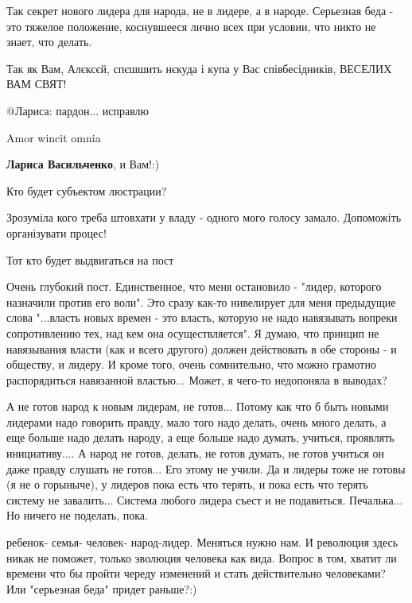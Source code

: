 \begin{itemize}
Так секрет нового лидера для народа, не в лидере, а в народе.
Серьезная беда - это тяжелое положение, коснувшееся лично всех при условии, что никто не знает, что делать.

Так як Вам, Алєксєй, спєшшить нєкуда і купа у Вас співбесідників, ВЕСЕЛИХ ВАМ СВЯТ!

@Лариса: пардон... исправлю

Amor wincit omnia

\textbf{Лариса Васильченко}, и Вам!:)

Кто будет субъектом люстрации?

Зрозуміла кого треба штовхати у владу - одного мого голосу замало. Допоможіть організувати процес!

Тот кто будет выдвигаться на пост

Очень глубокий пост. Единственное, что меня остановило - "лидер, которого
назначили против его воли". Это сразу как-то нивелирует для меня предыдущие
слова "...власть новых времен - это власть, которую не надо навязывать вопреки
сопротивлению тех, над кем она осуществляется". Я думаю, что принцип не
навязывания власти (как и всего другого) должен действовать в обе стороны - и
обществу, и лидеру. И кроме того, очень сомнительно, что можно грамотно
распорядиться навязанной властью... Может, я чего-то недопоняла в выводах?



А не готов народ к новым лидерам, не готов... Потому как что б быть новыми
лидерами надо говорить правду, мало того надо делать, очень много делать, а еще
больше надо делать народу, а еще больше надо думать, учиться, проявлять
инициативу.... А народ не готов, делать, не готов думать, не готов учиться он
даже правду слушать не готов... Его этому не учили. Да и лидеры тоже не готовы
(я не о горыныче), у лидеров пока есть что терять, и пока есть что терять
систему не завалить... Система любого лидера съест и не подавиться. Печалька...
Но ничего не поделать, пока.


ребенок- семья- человек- народ-лидер. Меняться нужно нам. И революция здесь
никак не поможет, только эволюция человека как вида. Вопрос в том, хватит ли
времени что бы пройти череду изменений и стать действительно человеками? Или
"серьезная беда" придет раньше?:)


\end{itemize}
